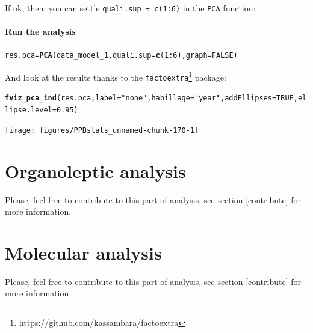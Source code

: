 \documentclass{book}\usepackage[]{graphicx}\usepackage[]{color}
\makeatletter
\newcommand{\hlnum}[1]{\textcolor[rgb]{0.686,0.059,0.569}{#1}}%
\newcommand{\hlstr}[1]{\textcolor[rgb]{0.192,0.494,0.8}{#1}}%
\newcommand{\hlopt}[1]{\textcolor[rgb]{0,0,0}{#1}}%
\newcommand{\hlstd}[1]{\textcolor[rgb]{0.345,0.345,0.345}{#1}}%
\newcommand{\hlkwb}[1]{\textcolor[rgb]{0.69,0.353,0.396}{#1}}%
\newcommand{\hlkwc}[1]{\textcolor[rgb]{0.333,0.667,0.333}{#1}}%
\newcommand{\hlkwd}[1]{\textcolor[rgb]{0.737,0.353,0.396}{\textbf{#1}}}%
\newenvironment{kframe}{%
 \def\at@end@of@kframe{}%
 \ifinner\ifhmode%
  \def\at@end@of@kframe{\end{minipage}}%
  \begin{minipage}{\columnwidth}%
 \fi\fi%
 \def\FrameCommand##1{\hskip\@totalleftmargin \hskip-\fboxsep
 \colorbox{shadecolor}{##1}\hskip-\fboxsep
     \hskip-\linewidth \hskip-\@totalleftmargin \hskip\columnwidth}%
 \MakeFramed {\advance\hsize-\width
   \@totalleftmargin\z@ \linewidth\hsize
   \@setminipage}}%
 {\par\unskip\endMakeFramed%
 \at@end@of@kframe}
\newenvironment{knitrout}{}{} %
\makeatother
\begin{document}
If ok, then, you can settle \texttt{quali.sup = c(1:6)} in the \texttt{PCA} function:

\subsubsection{Run the analysis}


\begin{knitrout}
\color{fgcolor}\begin{kframe}
\begin{alltt}
\hlstd{res.pca} \hlkwb{=} \hlkwd{PCA}\hlstd{(data_model_1,} \hlkwc{quali.sup} \hlstd{=} \hlkwd{c}\hlstd{(}\hlnum{1}\hlopt{:}\hlnum{6}\hlstd{),} \hlkwc{graph} \hlstd{=} \hlnum{FALSE}\hlstd{)}
\end{alltt}
\end{kframe}
\end{knitrout}

And look at the results thanks to the \texttt{factoextra}\footnote{https://github.com/kassambara/factoextra} package:

\begin{knitrout}
\color{fgcolor}\begin{kframe}
\begin{alltt}
\hlkwd{fviz_pca_ind}\hlstd{(res.pca,} \hlkwc{label}\hlstd{=}\hlstr{"none"}\hlstd{,} \hlkwc{habillage}\hlstd{=}\hlstr{"year"}\hlstd{,} \hlkwc{addEllipses}\hlstd{=}\hlnum{TRUE}\hlstd{,} \hlkwc{ellipse.level}\hlstd{=}\hlnum{0.95}\hlstd{)}
\end{alltt}
\end{kframe}

{\centering \texttt{[image: figures/PPBstats\_unnamed-chunk-170-1]} 

}



\end{knitrout}

\newpage

\chapter{Organoleptic analysis}
\label{organoleptic}
Please, feel free to contribute to this part of analysis, see section \ref{contribute} for more information.

\chapter{Molecular analysis}
\label{molecular}
Please, feel free to contribute to this part of analysis, see section \ref{contribute} for more information.
\end{document}
